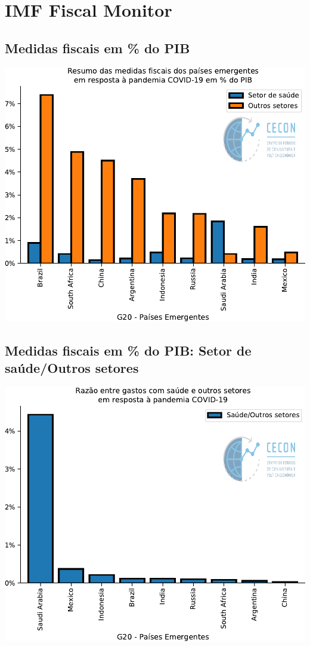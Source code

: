 \documentclass{SelfArx}
\begin{document}
\section*{IMF Fiscal Monitor}
\label{sec:org95b7fa7}
\subsection*{Medidas fiscais em \% do PIB}
\label{sec:orgfe6d707}

\begin{center}
\includegraphics[width=.9\linewidth]{./figs/IMF/FiscalMonitor_Covid.pdf}
\end{center}

\subsection*{Medidas fiscais em \% do PIB: Setor de saúde/Outros setores}
\label{sec:org8098bf6}

\begin{center}
\includegraphics[width=.9\linewidth]{./figs/IMF/FiscalMonitor_Covid_ratio.pdf}
\end{center}
\end{document}
